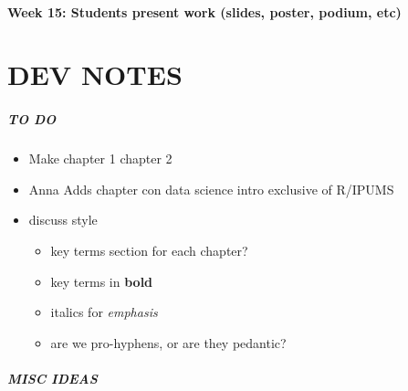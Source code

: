 \documentclass[
]{book}
\providecommand{\tightlist}{%
  \setlength{\itemsep}{0pt}\setlength{\parskip}{0pt}}
\begin{document}
\hypertarget{week-15-students-present-work-slides-poster-podium-etc}{%
\subsubsection*{Week 15: Students present work (slides, poster, podium, etc)}\label{week-15-students-present-work-slides-poster-podium-etc}}

\hypertarget{dev-notes}{%
\chapter*{DEV NOTES}\label{dev-notes}}

\hypertarget{to-do}{%
\paragraph*{TO DO}\label{to-do}}

\begin{itemize}
\item
  Make chapter 1 chapter 2
\item
  Anna Adds chapter con data science intro exclusive of R/IPUMS
\item
  discuss style

  \begin{itemize}
  \tightlist
  \item
    key terms section for each chapter?
  \item
    key terms in \textbf{bold}
  \item
    italics for \emph{emphasis}
  \item
    are we pro-hyphens, or are they pedantic?
  \end{itemize}
\end{itemize}

\hypertarget{misc-ideas}{%
\paragraph*{MISC IDEAS}\label{misc-ideas}}
\end{document}

